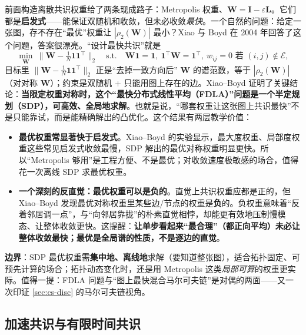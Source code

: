 前面构造离散共识权重给了两条现成路子：Metropolis 权重、$\mathbf{W}=\mathbf{I}-\varepsilon\mathbf{L}$。它们都是\textbf{启发式}——能保证双随机和收敛，但未必收敛\emph{最快}。一个自然的问题：给定一张图，存不存在“最优”权重让 $|\rho_2(\mathbf{W})|$ 最小？Xiao 与 Boyd 在 2004 年回答了这个问题，答案很漂亮\cite{xiaoboyd2004fast}。“设计最快共识”就是
\begin{equation}
  \min_{\mathbf{W}}\ \big\|\mathbf{W}-\tfrac1N\mathbf{1}\mathbf{1}^\top\big\|_2\quad\text{s.t.}\quad \mathbf{W}\mathbf{1}=\mathbf{1},\ \mathbf{1}^\top\mathbf{W}=\mathbf{1}^\top,\ w_{ij}=0\text{ 若 }(i,j)\notin\mathcal{E},
  \label{eq:cs-fdla}
\end{equation}
目标里 $\|\mathbf{W}-\tfrac1N\mathbf{1}\mathbf{1}^\top\|_2$ 正是“去掉一致方向后” $\mathbf{W}$ 的谱范数，等于 $|\rho_2(\mathbf{W})|$（对对称 $\mathbf{W}$）；约束是双随机 + 只能用图上存在的边。Xiao--Boyd 证明了关键结论：\textbf{当限定权重对称时，这个“最快分布式线性平均（FDLA）”问题是一个半定规划（SDP），可高效、全局地求解}。也就是说，“哪套权重让这张图上共识最快”不是只能靠试，而是能精确解出的凸优化。这个结果有两层教学价值：
\begin{itemize}
  \item \textbf{最优权重常显著快于启发式}。Xiao--Boyd 的实验显示，最大度权重、局部度权重这些常见启发式收敛最慢，SDP 解出的最优对称权重明显更快。所以“Metropolis 够用”是工程方便、不是最优；对收敛速度极敏感的场合，值得花一次离线 SDP 求最优权重。
  \item \textbf{一个深刻的反直觉：最优权重可以是负的}。直觉上共识权重应都是正的，但 Xiao--Boyd 发现最优对称权重里某些边/节点的权重是\textbf{负}的。负权重意味着“反着邻居调一点”，与“向邻居靠拢”的朴素直觉相悖，却能更有效地压制慢模态、让整体收敛更快。这提醒：\textbf{让单步看起来“最合理”（都正向平均）未必让整体收敛最快；最优是全局谱的性质，不是逐边的直觉}。
\end{itemize}
\textbf{边界}：SDP 最优权重需\textbf{集中地、离线地}求解（要知道整张图），适合拓扑固定、可预先计算的场合；拓扑动态变化时，还是用 Metropolis 这类\emph{局部可算}的权重更实际。值得一提：FDLA 问题与“图上最快混合马尔可夫链”是对偶的两面——又一次印证 \cref{sec:cs-disc} 的马尔可夫链视角。

\subsection{加速共识与有限时间共识}
\label{sec:cs-finite}

